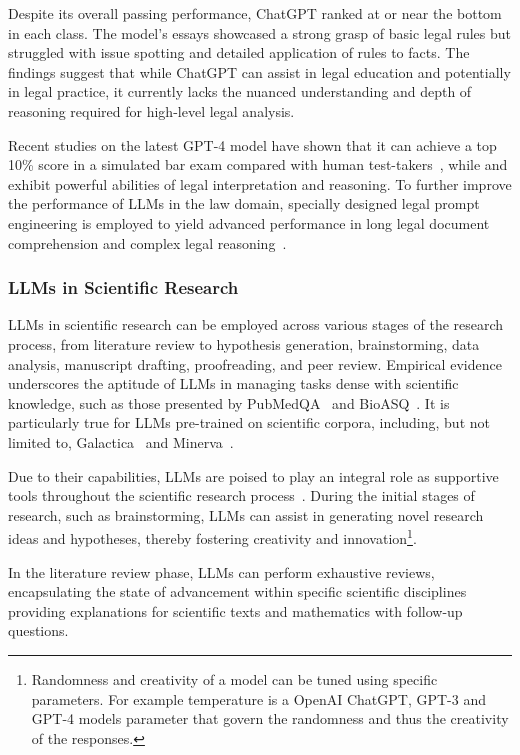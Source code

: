 Despite its overall passing performance, ChatGPT ranked at or near the bottom in each class.
The model's essays showcased a strong grasp of basic legal rules but struggled with issue spotting and detailed application of rules to facts.
The findings suggest that while ChatGPT can assist in legal education and potentially in legal practice, it currently lacks the nuanced understanding and depth of reasoning required for high-level legal analysis.

Recent studies on the latest GPT-4 model have shown that it can achieve a top 10\% score in a simulated bar exam compared with human test-takers~\cite{openai2024gpt4}, while \textcite{nay2022lawinformscode} and exhibit powerful abilities of legal interpretation and reasoning.
To further improve the performance of LLMs in the law domain, specially designed legal prompt engineering is employed to yield advanced performance in long legal document comprehension and complex legal reasoning~\cite{survey}.


\subsubsection{LLMs in Scientific Research}
\label{subsubsec:llms-in-scientific-research}

LLMs in scientific research can be employed across various stages of the research process, from literature review to hypothesis generation, brainstorming, data analysis, manuscript drafting, proofreading, and peer review.
Empirical evidence underscores the aptitude of LLMs in managing tasks dense with scientific knowledge, such as those presented by PubMedQA~\cite{jin2019pubmedqa} and BioASQ~\cite{krithara2022bioasq}.
It is particularly true for LLMs pre-trained on scientific corpora, including, but not limited to, Galactica~\cite{taylor2022galactica} and Minerva~\cite{lewkowycz2022minerva}.

Due to their capabilities, LLMs are poised to play an integral role as supportive tools throughout the scientific research process~\cite{zhang2023smallstep}.
During the initial stages of research, such as brainstorming, LLMs can assist in generating novel research ideas and hypotheses, thereby fostering creativity and innovation\footnote{Randomness and creativity of a model can be tuned using specific parameters. For example temperature is a OpenAI ChatGPT, GPT-3 and GPT-4 models parameter that govern the randomness and thus the creativity of the responses.}.

In the literature review phase, LLMs can perform exhaustive reviews, encapsulating the state of advancement within specific scientific disciplines~\cite{haman2023usingchatgpt, aydin2022openaichatgpt} providing explanations for scientific texts and mathematics with follow-up questions.

